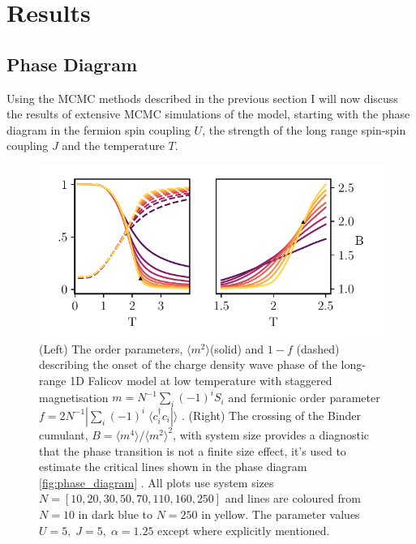 \hypertarget{fk-results}{%
\section{Results}\label{fk-results}}

\hypertarget{lrfk-results-phase-diagram}{%
\subsection{Phase Diagram}\label{lrfk-results-phase-diagram}}

Using the MCMC methods described in the previous section I will now discuss the results of extensive MCMC simulations of the model, starting with the phase diagram in the fermion spin coupling \(U\), the strength of the long range spin-spin coupling \(J\) and the temperature \(T\).

\hypertarget{fig:binder_cumulants}{%
\begin{figure}
\centering
\includegraphics[width=1\textwidth,height=\textheight]{figure_code/fk_chapter/binder_cumulants/binder_cumulants}
\caption[{Binder Cumulants}]{(Left) The order parameters, \(\langle m^2 \rangle\)(solid) and \(1 - f\) (dashed) describing the onset of the charge density wave phase of the long-range 1D Falicov model at low temperature with staggered magnetisation \(m = N^{-1} \sum_i (-1)^i S_i\) and fermionic order parameter \(f = 2 N^{-1}|\sum_i (-1)^i \; \langle c^\dagger_{i}c_{i}| \rangle\) . (Right) The crossing of the Binder cumulant, \(B = \langle m^4 \rangle / \langle m^2 \rangle^2\), with system size provides a diagnostic that the phase transition is not a finite size effect, it's used to estimate the critical lines shown in the phase diagram \cref{fig:phase_diagram} . All plots use system sizes \(N = [10,20,30,50,70,110,160,250]\) and lines are coloured from \(N = 10\) in dark blue to \(N = 250\) in yellow. The parameter values \(U = 5,\;J = 5,\;\alpha = 1.25\) except where explicitly mentioned.}
\label{fig:binder_cumulants}
\end{figure}
}

